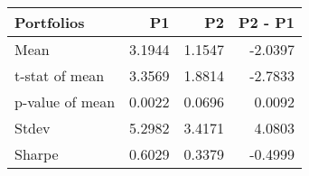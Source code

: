 \begin{tabular}{lrrr}
\toprule
Portfolios & P1 & P2 & P2 - P1 \\
\midrule
Mean & 3.1944 & 1.1547 & -2.0397 \\
t-stat of mean & 3.3569 & 1.8814 & -2.7833 \\
p-value of mean & 0.0022 & 0.0696 & 0.0092 \\
Stdev & 5.2982 & 3.4171 & 4.0803 \\
Sharpe & 0.6029 & 0.3379 & -0.4999 \\
\bottomrule
\end{tabular}
